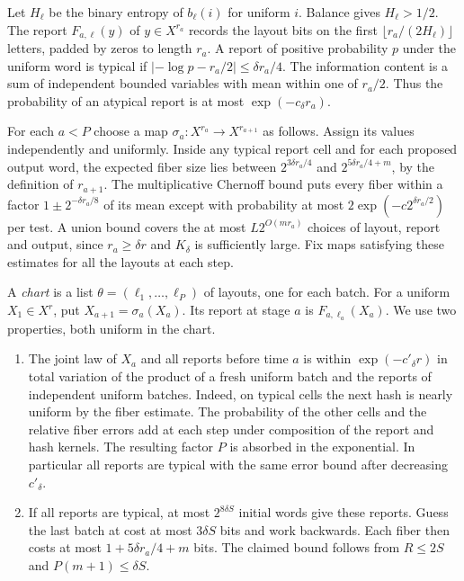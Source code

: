 Let \(H_\ell\) be the binary entropy of \(b_\ell(i)\) for uniform
\(i\). Balance gives \(H_\ell>1/2\). The report
\(F_{a,\ell}(y)\) of \(y\in X^{r_a}\) records the layout bits on
the first \(\lfloor r_a/(2H_\ell)\rfloor\) letters, padded by zeros
to length \(r_a\). A report of positive probability \(p\) under the
uniform word is typical if
\( |{-\log p}-r_a/2|\le\delta r_a/4\).
The information content is a sum of independent bounded variables with
mean within one of \(r_a/2\). Thus the probability of an atypical
report is at most \(\exp(-c_\delta r_a)\).

For each \(a<P\) choose a map
\(\sigma_a:X^{r_a}\to X^{r_{a+1}}\) as follows. Assign its values
independently and uniformly. Inside any typical report cell and for
each proposed output word, the expected fiber size lies between
\(2^{3\delta r_a/4}\) and \(2^{5\delta r_a/4+m}\), by the definition
of \(r_{a+1}\). The multiplicative Chernoff bound puts every fiber within
a factor \(1\pm2^{-\delta r_a/8}\) of its mean except with probability
at most \(2\exp(-c2^{\delta r_a/2})\) per test. A union bound covers
the at most \(L2^{O(mr_a)}\) choices of layout, report and output,
since \(r_a\ge\delta r\) and \(K_\delta\) is sufficiently large.
Fix maps satisfying these estimates for all the layouts at each step.

A \emph{chart} is a list \(\theta=(\ell_1,\ldots,\ell_P)\) of layouts,
one for each batch. For a uniform \(X_1\in X^r\), put
\(X_{a+1}=\sigma_a(X_a)\). Its report at stage \(a\) is
\(F_{a,\ell_a}(X_a)\). We use two properties, both uniform in the chart.
\begin{enumerate}
\item The joint law of \(X_a\) and all reports before time \(a\)
is within \(\exp(-c'_\delta r)\) in total variation of the product
of a fresh uniform batch and the reports of independent uniform
batches. Indeed, on typical cells the next hash is nearly uniform
by the fiber estimate. The probability of the other cells and the
relative fiber errors add at each step under composition of the
report and hash kernels. The resulting factor \(P\) is absorbed in
the exponential. In particular all reports are typical with the same
error bound after decreasing \(c'_\delta\).
\item If all reports are typical, at most \(2^{8\delta S}\) initial
words give these reports. Guess the last batch at cost at most
\(3\delta S\) bits and work backwards. Each fiber then costs at
most \(1+5\delta r_a/4+m\) bits. The claimed bound follows from
\(R\le2S\) and \(P(m+1)\le\delta S\).
\end{enumerate}

